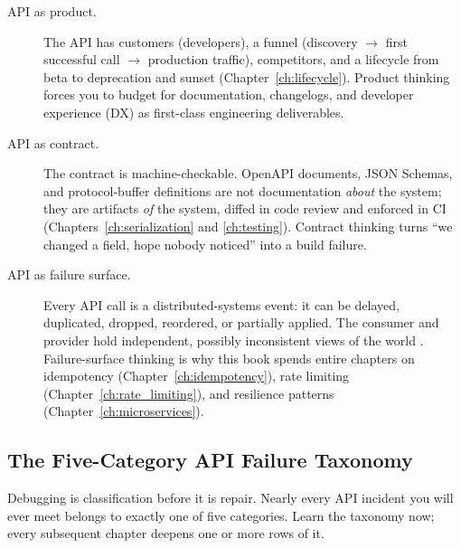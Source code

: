 \begin{description}
  \item[API as product.] The API has customers (developers), a funnel
    (discovery $\to$ first successful call $\to$ production traffic),
    competitors, and a lifecycle from beta to deprecation and sunset
    (Chapter~\ref{ch:lifecycle}). Product thinking forces you to budget for
    documentation, changelogs, and developer experience (DX) as
    first-class engineering deliverables.
  \item[API as contract.] The contract is machine-checkable. OpenAPI
    documents, JSON Schemas, and protocol-buffer definitions are not
    documentation \emph{about} the system; they are artifacts \emph{of} the
    system, diffed in code review and enforced in CI
    (Chapters~\ref{ch:serialization} and \ref{ch:testing}). Contract
    thinking turns ``we changed a field, hope nobody noticed'' into a build
    failure.
  \item[API as failure surface.] Every API call is a distributed-systems
    event: it can be delayed, duplicated, dropped, reordered, or partially
    applied. The consumer and provider hold independent, possibly
    inconsistent views of the world \cite{kleppmann2017ddia}. Failure-surface
    thinking is why this book spends entire chapters on idempotency
    (Chapter~\ref{ch:idempotency}), rate limiting
    (Chapter~\ref{ch:rate_limiting}), and resilience patterns
    (Chapter~\ref{ch:microservices}).
\end{description}

\subsection{The Five-Category API Failure Taxonomy}
\label{sec:ch0-taxonomy}

Debugging is classification before it is repair. Nearly every API incident
you will ever meet belongs to exactly one of five categories. Learn the
taxonomy now; every subsequent chapter deepens one or more rows of it.

